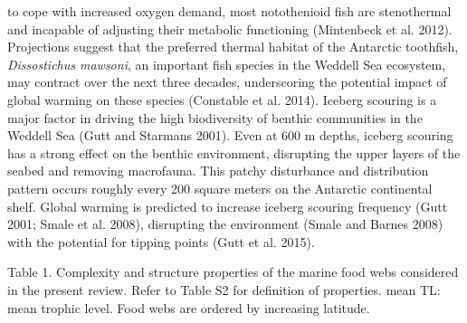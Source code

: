 \documentclass[
]{article}
\begin{document}
to cope with increased oxygen demand, most notothenioid fish are
stenothermal and incapable of adjusting their metabolic functioning
(Mintenbeck et al. 2012). Projections suggest that the preferred thermal
habitat of the Antarctic toothfish, \emph{Dissostichus mawsoni}, an
important fish species in the Weddell Sea ecosystem, may contract over
the next three decades, underscoring the potential impact of global
warming on these species (Constable et al. 2014). Iceberg scouring is a
major factor in driving the high biodiversity of benthic communities in
the Weddell Sea (Gutt and Starmans 2001). Even at 600 m depths, iceberg
scouring has a strong effect on the benthic environment, disrupting the
upper layers of the seabed and removing macrofauna. This patchy
disturbance and distribution pattern occurs roughly every 200 square
meters on the Antarctic continental shelf. Global warming is predicted
to increase iceberg scouring frequency (Gutt 2001; Smale et al. 2008),
disrupting the environment (Smale and Barnes 2008) with the potential
for tipping points (Gutt et al. 2015).

\newpage
\footnotesize

Table 1. Complexity and structure properties of the marine food webs
considered in the present review. Refer to Table S2 for definition of
properties. mean TL: mean trophic level. Food webs are ordered by
increasing latitude.
\end{document}
